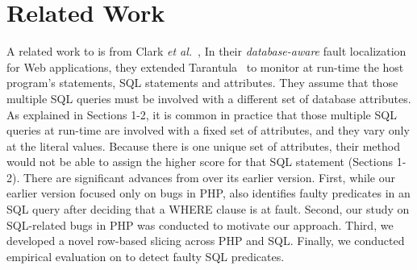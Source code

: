 \section{Related Work}

A related work to {\tool} is from Clark {\em et al.}~\cite{ga-ase11},
In their {\em database-aware} fault localization for Web applications,
they extended Tarantula~\cite{tarantula05} to monitor at run-time the
host program's statements, SQL statements and attributes.
They assume that those multiple SQL queries must be involved with a
different set of database attributes. As explained in Sections 1-2,
it is common in practice that those multiple SQL queries at run-time
are involved with a fixed set of attributes, and they vary only at the
literal values.
Because there is one unique set of attributes, their method would not
be able to assign the higher score for that SQL statement (Sections
1-2). 
There are significant advances from {\tool} over its earlier
version. First, while our earlier version focused only on bugs in PHP,
{\tool} also identifies faulty predicates in an SQL query after
deciding that a WHERE clause is at fault. Second, our study
on SQL-related bugs in PHP was conducted to motivate our
approach. Third, we developed a novel row-based slicing across PHP and
SQL. Finally, we conducted empirical evaluation
on {\tool} to detect faulty SQL predicates.

